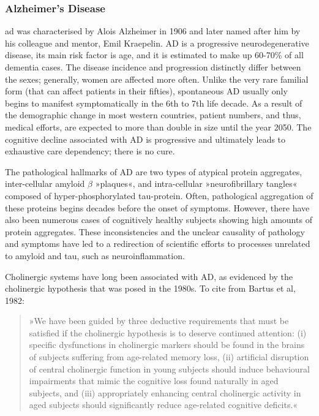 \subsubsection{Alzheimer's Disease}
\ac{ad} was characterised by Alois Alzheimer in 1906 and later named after him by his colleague and mentor, Emil Kraepelin\cite{Berrios1990}. AD is a progressive neurodegenerative disease, its main risk factor is age, and it is estimated to make up 60-70\% of all dementia cases. The disease incidence and progression distinctly differ between the sexes\cite{Miech2002}; generally, women are affected more often. Unlike the very rare familial form (that can affect patients in their fifties), spontaneous AD usually only begins to manifest symptomatically in the 6th to 7th life decade. As a result of the demographic change in most western countries, patient numbers, and thus, medical efforts, are expected to more than double in size until the year 2050. The cognitive decline associated with AD is progressive and ultimately leads to exhaustive care dependency; there is no cure.

The pathological hallmarks of AD are two types of atypical protein aggregates, inter-cellular amyloid $\beta$ »plaques«, and intra-cellular »neurofibrillary tangles« composed of hyper-phosphorylated tau-protein. Often, pathological aggregation of these proteins begins decades before the onset of symptoms. However, there have also been numerous cases of cognitively healthy subjects showing high amounts of protein aggregates. These inconsistencies and the unclear causality of pathology and symptoms have led to a redirection of scientific efforts to processes unrelated to amyloid and tau, such as neuroinflammation.

Cholinergic systems have long been associated with AD, as evidenced by the cholinergic hypothesis that was posed in the 1980s. To cite from Bartus et al, 1982\cite{Bartus1982}:

\begin{quote}
»We have been guided by three deductive requirements that must be satisfied if the cholinergic hypothesis is to deserve continued attention: (i) specific dysfunctions in cholinergic markers should be found in the brains of subjects suffering from age-related memory loss, (ii) artificial disruption of central cholinergic function in young subjects should induce behavioural impairments that mimic the cognitive loss found naturally in aged subjects, and (iii) appropriately enhancing central cholinergic activity in aged subjects should significantly reduce age-related cognitive deficits.«
\end{quote}

